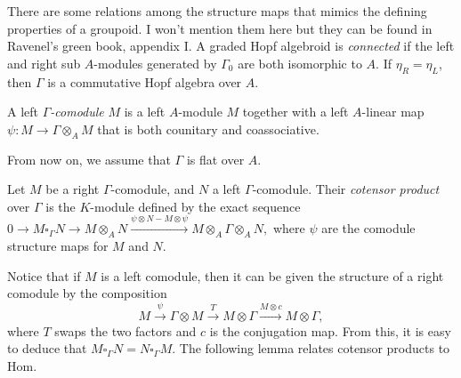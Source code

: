 There are some relations among the structure maps that mimics the defining properties of a groupoid.  I won't mention them here but they can be found in Ravenel's green book, appendix I.  A graded Hopf algebroid is \textit{connected} if the left and right sub $ A$-modules generated by $ \Gamma_0$ are both isomorphic to $ A$.  If $ \eta_R = \eta_L$, then $ \Gamma$ is a commutative Hopf algebra over $ A$.

\begin{definition} 
A left \textit{$ \Gamma$-comodule} $ M$ is a left $ A$-module $ M$ together with a left $ A$-linear map $ \psi: M \to \Gamma \otimes_A M$ that is both counitary and coassociative.
\end{definition}

From now on, we assume that $ \Gamma$ is flat over $ A$.

\begin{definition} 
Let $ M$ be a right $ \Gamma$-comodule, and $ N$ a left $ \Gamma$-comodule.  Their \textit{cotensor product} over $ \Gamma$ is the $ K$-module defined by the exact sequence
$ \displaystyle 0 \rightarrow M \square_{\Gamma} N \rightarrow M \otimes_A N \stackrel{\psi \otimes N - M \otimes \psi}{\longrightarrow} M \otimes_A \Gamma \otimes_A N,$
where $\psi$ are the comodule structure maps for $ M$ and $ N$.
\end{definition}

Notice that if $ M$ is a left comodule, then it can be given the structure of a right comodule by the composition
$$ M \stackrel{\psi}{\longrightarrow} \Gamma \otimes M \stackrel{T}{\longrightarrow} M \otimes \Gamma \stackrel{M \otimes c}{\longrightarrow} M \otimes \Gamma,$$
where $ T$ swaps the two factors and $ c$ is the conjugation map.  From this, it is easy to deduce that $ M \square_{\Gamma}N = N \square_{\Gamma} M$.  The following lemma relates cotensor products to Hom.

